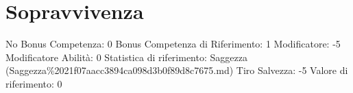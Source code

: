 \section{Sopravvivenza}\label{sopravvivenza}

\begin{description}
\tightlist
\item[Tags: ABI]
No Bonus Competenza: 0 Bonus Competenza di Riferimento: 1 Modificatore:
-5 Modificatore Abilità: 0 Statistica di riferimento: Saggezza
(Saggezza\%2021f07aacc3894ca098d3b0f89d8c7675.md) Tiro Salvezza: -5
Valore di riferimento: 0
\end{description}
